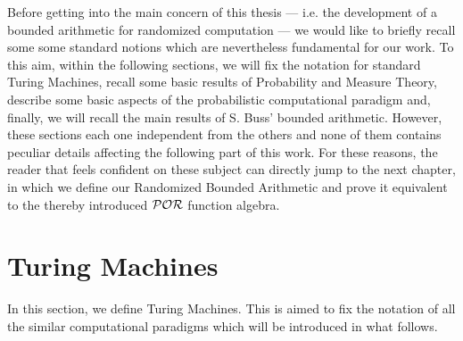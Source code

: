 
Before getting into the main concern of this thesis --- i.e. the development
of a bounded arithmetic for randomized computation --- we would like to
briefly recall some some standard notions which are nevertheless fundamental
for our work.
%
To this aim, within the following sections, we will fix the notation for
standard Turing Machines, recall some basic results
of Probability and Measure
Theory,
describe some basic aspects of the probabilistic computational paradigm and, finally,
we will recall the main results of S. Buss' bounded arithmetic.
%
However,
these sections each one independent from the others and
none of them contains peculiar details affecting the following part of this
work. For these reasons, the reader that feels confident on these subject
can directly jump to the next chapter, in which we define our Randomized
Bounded Arithmetic and prove it equivalent to the thereby introduced $\mathcal{POR}$
function algebra.















\section{Turing Machines}

In this section, we define Turing Machines. This is aimed to
fix the notation of all the similar computational paradigms which will be introduced
in what follows.

